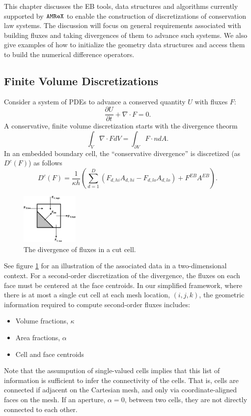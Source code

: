 This chapter discusses the EB tools, data structures and algorithms currently supported by
$\tt{AMReX}$ to enable the construction of discretizations of conservation law systems.
The discussion will focus on general requirements associated with building fluxes and
taking divergences of them to advance such systems.  We also give examples of how to
initialize the geometry data structures and access them to build the numerical difference
operators.

\subsection{Finite Volume Discretizations}
Consider a system of PDEs to advance a conserved quantity $U$
with fluxes $F$:
\begin{equation}
\frac{\partial U}{\partial t} + \nabla \cdot F = 0.
\label{eqn::hypsys}
\end{equation}
A conservative, finite volume discretization starts with
the divergence theorm
$$
\int_V \nabla \cdot F dV = \int_{\partial V} F \cdot n dA.
$$
In an embedded boundary cell, the ``conservative divergence'' is discretized  (as
$D^c(F)$) as follows
\begin{equation}
D^c(F) = \frac{1}{\kappa h} \left( \sum^D_{d = 1}
  (F_{d, hi}A_{d,hi} - F_{d, lo}A_{d,lo})  + F^{EB} A^{EB} \right).
\label{eqn::ebdiv}
\end{equation}

\begin{figure}[h]
  \centering
  \includegraphics[width=0.25\textwidth]{./EB/eb_fluxes.pdf}
  \caption{\label{fig::eb_fluxes}The divergence of fluxes in a cut cell.}
\end{figure}
See figure \ref{fig::eb_fluxes} for an illustration of the associated data
in a two-dimensional context.  For a second-order discretization of the
divergence, the fluxes on each face must be centered at the face centroids.  
In our simplified framework, where there is at most a single cut cell
at each mesh location, $(i,j,k)$, the geometric information required to
compute second-order fluxes includes:
\begin{itemize}
\item
Volume fractions, $\kappa$
\item
Area fractions, $\alpha$
\item 
Cell and face centroids
\end{itemize}
Note that the assumpution of single-valued cells implies that this list of
information is sufficient to infer the connectivity of the cells.  That is,
cells are connected if adjacent on the Cartesian mesh, and only via
coordinate-aligned faces on the mesh.  If an aperture, $\alpha = 0$, between two
cells, they are not directly connected to each other.

